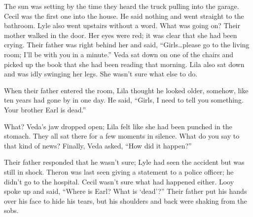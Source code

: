 \documentclass[
  letterpaper,
]{book}
\begin{document}
The sun was setting by the time they heard the truck pulling into the
garage. Cecil was the first one into the house. He said nothing and went
straight to the bathroom. Lyle also went upstairs without a word. What
was going on? Their mother walked in the door. Her eyes were red; it was
clear that she had been crying. Their father was right behind her and
said, ``Girls\ldots please go to the living room; I'll be with you in a
minute.'' Veda sat down on one of the chairs and picked up the book that
she had been reading that morning. Lila also sat down and was idly
swinging her legs. She wasn't sure what else to do.

When their father entered the room, Lila thought he looked older,
somehow, like ten years had gone by in one day. He said, ``Girls, I need
to tell you something. Your brother Earl is dead.''

What? Veda's jaw dropped open; Lila felt like she had been punched in
the stomach. They all sat there for a few moments in silence. What do
you say to that kind of news? Finally, Veda asked, ``How did it
happen?''

Their father responded that he wasn't sure; Lyle had seen the accident
but was still in shock. Theron was last seen giving a statement to a
police officer; he didn't go to the hospital. Cecil wasn't sure what had
happened either. Looy spoke up and said, ``Where is Earl? What is
`dead'?'' Their father put his hands over his face to hide his tears,
but his shoulders and back were shaking from the sobs.
\end{document}
